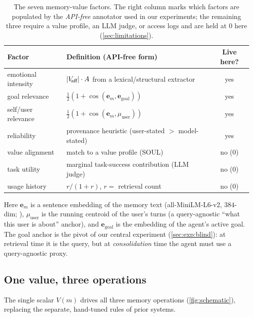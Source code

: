 \begin{table}[ht!]
\centering\small
\caption{The seven memory-value factors. The right column marks which
factors are populated by the \emph{API-free} annotator used in our
experiments; the remaining three require a value profile, an LLM judge,
or access logs and are held at $0$ here (\cref{sec:limitations}).}
\label{tab:factors}
\begin{tabular}{llc}
\toprule
Factor & Definition (API-free form) & Live here? \\
\midrule
emotional intensity & $|V_{\!\text{aff}}|\cdot A$ from a lexical/structural extractor & yes \\
goal relevance      & $\tfrac12(1+\cos(\mathbf{e}_m, \mathbf{e}_{\text{goal}}))$ & yes \\
self/user relevance & $\tfrac12(1+\cos(\mathbf{e}_m, \mu_{\text{user}}))$ & yes \\
reliability         & provenance heuristic (user-stated $>$ model-stated) & yes \\
value alignment     & match to a value profile (SOUL) & no ($0$) \\
task utility        & marginal task-success contribution (LLM judge) & no ($0$) \\
usage history       & $r/(1+r)$, $r=$ retrieval count & no ($0$) \\
\bottomrule
\end{tabular}
\end{table}

Here $\mathbf{e}_m$ is a sentence embedding of the memory text
(all-MiniLM-L6-v2, $384$-dim; \citealp{reimers2019sbert}),
$\mu_{\text{user}}$ is the running centroid of the user's turns (a
query-agnostic ``what this user is about'' anchor), and
$\mathbf{e}_{\text{goal}}$ is the embedding of the agent's active goal.
The goal anchor is the pivot of our central experiment
(\cref{sec:exp:blind}): at retrieval time it is the query, but at
\emph{consolidation} time the agent must use a query-agnostic proxy.

\subsection{One value, three operations}
\label{sec:method:control}

The single scalar $V(m)$ drives all three memory operations
(\cref{fig:schematic}), replacing the separate, hand-tuned rules of prior
systems.


